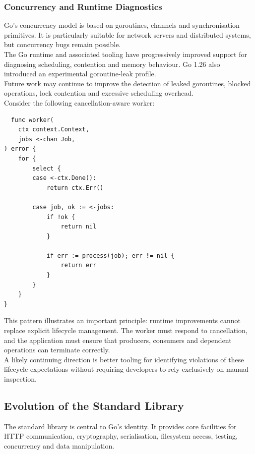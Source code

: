 \subsubsection{Concurrency and Runtime Diagnostics}

Go's concurrency model is based on goroutines, channels and synchronisation primitives. It is particularly suitable for network servers and distributed systems, but concurrency bugs remain possible.\\

The Go runtime and associated tooling have progressively improved support for diagnosing scheduling, contention and memory behaviour. Go 1.26 also introduced an experimental goroutine-leak profile.\\

Future work may continue to improve the detection of leaked goroutines, blocked operations, lock contention and excessive scheduling overhead.\\

Consider the following cancellation-aware worker:

\begin{lstlisting}
  func worker(
    ctx context.Context,
    jobs <-chan Job,
) error {
    for {
        select {
        case <-ctx.Done():
            return ctx.Err()

        case job, ok := <-jobs:
            if !ok {
                return nil
            }

            if err := process(job); err != nil {
                return err
            }
        }
    }
}
\end{lstlisting}

This pattern illustrates an important principle: runtime improvements cannot replace explicit lifecycle management. The worker must respond to cancellation, and the application must ensure that producers, consumers and dependent operations can terminate correctly.\\

A likely continuing direction is better tooling for identifying violations of these lifecycle expectations without requiring developers to rely exclusively on manual inspection.

\subsection{Evolution of the Standard Library}

The standard library is central to Go's identity. It provides core facilities for HTTP communication, cryptography, serialisation, filesystem access, testing, concurrency and data manipulation.\\

